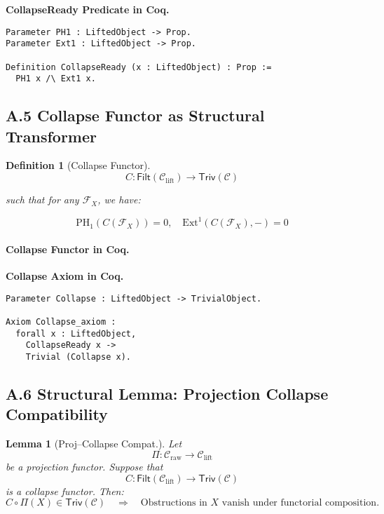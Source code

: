 \documentclass[11pt]{article}
\newtheorem{definition}[theorem]{Definition}
\newtheorem{lemma}[theorem]{Lemma}
\begin{document}
\textbf{CollapseReady Predicate in Coq.}
\vspace{0.5em}

\begin{lstlisting}[language=Coq]
Parameter PH1 : LiftedObject -> Prop.
Parameter Ext1 : LiftedObject -> Prop.

Definition CollapseReady (x : LiftedObject) : Prop :=
  PH1 x /\ Ext1 x.
\end{lstlisting}


\subsection*{A.5 Collapse Functor as Structural Transformer}

\begin{definition}[Collapse Functor]
\[
C : \mathsf{Filt}(\mathcal{C}_{\mathrm{lift}}) \longrightarrow \mathsf{Triv}(\mathcal{C})
\]

such that for any \( \mathcal{F}_X \), we have:

\[
\mathrm{PH}_1(C(\mathcal{F}_X)) = 0, \quad \mathrm{Ext}^1(C(\mathcal{F}_X), -) = 0
\]
\end{definition}

\paragraph{Collapse Functor in Coq.}

\textbf{Collapse Axiom in Coq.}
\vspace{0.5em}

\begin{lstlisting}[language=Coq]
Parameter Collapse : LiftedObject -> TrivialObject.

Axiom Collapse_axiom :
  forall x : LiftedObject,
    CollapseReady x ->
    Trivial (Collapse x).
\end{lstlisting}


\subsection*{A.6 Structural Lemma: Projection Collapse Compatibility}

\begin{lemma}[Proj–Collapse Compat.]
Let 
\[
\Pi: \mathcal{C}_{\mathrm{raw}} \to \mathcal{C}_{\mathrm{lift}}
\]
be a projection functor. Suppose that 
\[
C: \mathsf{Filt}(\mathcal{C}_{\mathrm{lift}}) \to \mathsf{Triv}(\mathcal{C})
\]
is a collapse functor. Then:
\[
C \circ \Pi(X) \in \mathsf{Triv}(\mathcal{C}) \quad \Rightarrow \quad
\text{Obstructions in } X \text{ vanish under functorial composition}.
\]
\end{lemma}
\end{document}
